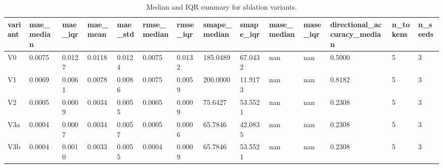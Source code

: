 \begin{table}[htbp]
\centering
\begin{tabular}{llllllllllllll}
\hline
variant & mae_median & mae_iqr & mae_mean & mae_std & rmse_median & rmse_iqr & smape_median & smape_iqr & mase_median & mase_iqr & directional_accuracy_median & n_tokens & n_seeds \\
\hline
V0 & 0.0075 & 0.0127 & 0.0118 & 0.0124 & 0.0075 & 0.0132 & 185.0489 & 67.0432 & nan & nan & 0.5000 & 5 & 3 \\
V1 & 0.0069 & 0.0061 & 0.0078 & 0.0086 & 0.0075 & 0.0059 & 200.0000 & 11.9173 & nan & nan & 0.8182 & 5 & 3 \\
V2 & 0.0005 & 0.0009 & 0.0034 & 0.0055 & 0.0005 & 0.0009 & 75.6427 & 53.5521 & nan & nan & 0.2308 & 5 & 3 \\
V3a & 0.0004 & 0.0007 & 0.0034 & 0.0057 & 0.0005 & 0.0006 & 65.7846 & 42.0835 & nan & nan & 0.2308 & 5 & 3 \\
V3b & 0.0004 & 0.0010 & 0.0033 & 0.0055 & 0.0004 & 0.0009 & 65.7846 & 53.5521 & nan & nan & 0.2308 & 5 & 3 \\
\hline
\end{tabular}
\caption{Median and IQR summary for ablation variants.}
\label{table_ablation_median_iqr}
\end{table}
